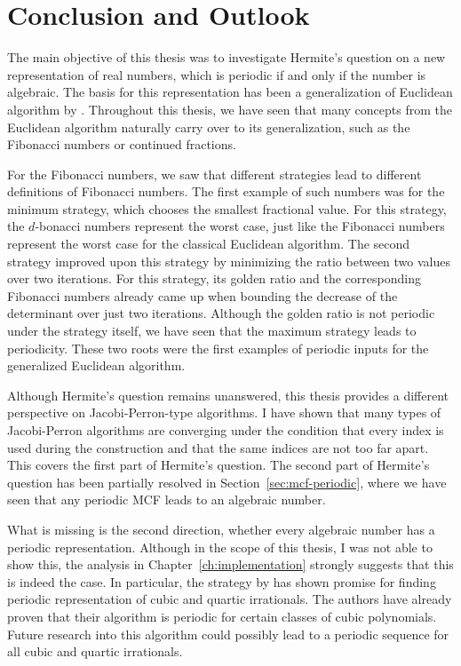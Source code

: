 \chapter{Conclusion and Outlook}
\label{ch:conclusion}

The main objective of this thesis
was to investigate Hermite's question
on a new representation of real numbers,
which is periodic if and only if the number is algebraic.
The basis for this representation has been a generalization of Euclidean
algorithm by \citeauthor{Klein24}.
Throughout this thesis,
we have seen that many concepts from the Euclidean algorithm naturally carry
over to its generalization, such as the Fibonacci numbers or continued
fractions.

For the Fibonacci numbers,
we saw that different strategies lead to different definitions of Fibonacci numbers.
The first example of such numbers was for the minimum strategy,
which chooses the smallest fractional value.
For this strategy, the $d$-bonacci numbers represent the worst case,
just like the Fibonacci numbers represent the worst case for the classical
Euclidean algorithm.
The second strategy improved upon this strategy by minimizing the ratio between two values over two iterations.
For this strategy, its golden ratio and the corresponding Fibonacci numbers
already came up when bounding the decrease of the determinant over just two iterations.
Although the golden ratio is not periodic under the strategy itself,
we have seen that the maximum strategy leads to periodicity.
These two roots were the first examples of periodic inputs for the generalized Euclidean algorithm.


Although Hermite's question remains unanswered,
this thesis provides a different perspective on Jacobi-Perron-type algorithms.
I have shown that many types of Jacobi-Perron algorithms are converging
under the condition that every index is used during the construction and that
the same indices are not too far apart.
This covers the first part of Hermite's question.
The second part of Hermite's question has been partially resolved in Section~\ref{sec:mcf-periodic},
where we have seen that any periodic MCF leads to an algebraic number.

What is missing is the second direction,
whether every algebraic number has a periodic representation.
Although in the scope of this thesis,
I was not able to show this,
the analysis in Chapter~\ref{ch:implementation}
strongly suggests that this is indeed the case.
In particular, the strategy by \citeauthor{Tamura09} has shown promise for
finding periodic representation of cubic and quartic irrationals.
The authors have already proven that their algorithm is periodic for certain
classes of cubic polynomials.
Future research into this algorithm could possibly lead to a periodic sequence
for all cubic and quartic irrationals.

